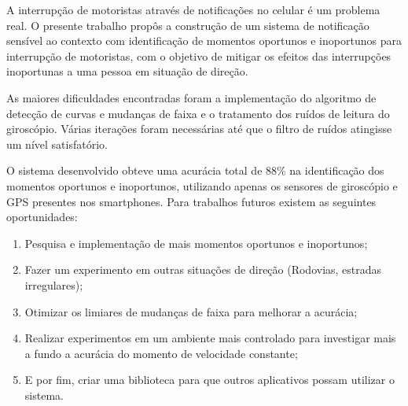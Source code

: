 \label{conclusao}

A interrupção de motoristas através de notificações no celular é um problema
real. O presente trabalho propôs a construção de um sistema de notificação sensível ao
contexto com identificação de momentos oportunos e inoportunos para interrupção de
motoristas, com o objetivo de mitigar os efeitos das interrupções inoportunas a uma
pessoa em situação de direção.

As maiores dificuldades encontradas foram a implementação do algoritmo de detecção
de curvas e mudanças de faixa e o tratamento dos ruídos de leitura do giroscópio.
Várias iterações foram necessárias até que o filtro de ruídos atingisse um nível
satisfatório.

O sistema desenvolvido obteve uma acurácia total de 88\% na identificação dos momentos
oportunos e inoportunos, utilizando apenas os sensores de giroscópio e GPS presentes
nos smartphones. Para trabalhos futuros existem as seguintes oportunidades:

\begin{enumerate}
  \item Pesquisa e implementação de mais momentos oportunos e inoportunos;
  \item Fazer um experimento em outras situações de direção (Rodovias, estradas irregulares);
  \item Otimizar os limiares de mudanças de faixa para melhorar a acurácia;
  \item Realizar experimentos em um ambiente mais controlado para investigar mais a fundo
  a acurácia do momento de velocidade constante;
  \item E por fim, criar uma biblioteca para que outros aplicativos possam utilizar o sistema.
\end{enumerate}
